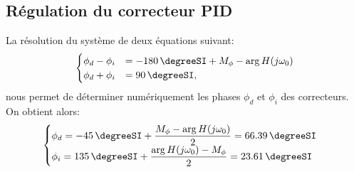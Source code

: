\subsection*{Régulation du correcteur PID}
La résolution du système de deux équations suivant:
\[
\begin{cases}
    \phi_d-\phi_i&=\SI{-180}{\degreeSI}+M_\phi-\arg{H(j\omega_0)} \\
    \phi_d+\phi_i&=\SI{90}{\degreeSI},
\end{cases}
\]
nous permet de déterminer numériquement les phases $\phi_d$ et 
$\phi_i$ des correcteurs. On obtient alors:
\[
\begin{cases}
    \phi_d=\SI{-45}{\degreeSI}+
           \dfrac{M_\phi-\arg{H(j\omega_0)}}{2}=\SI{66.39}{\degreeSI} \\
    \phi_i=\SI{135}{\degreeSI}+
           \dfrac{\arg{H(j\omega_0)}-M_\phi}{2}=\SI{23.61}{\degreeSI}
\end{cases}
\]

